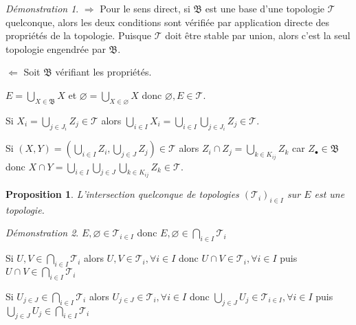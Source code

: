 \documentclass[a4paper, 11pt, french]{book}
\newenvironment{itemise}{\itemize}{\enditemize}
\theoremstyle{plain} %
\newtheorem{proposition}{Proposition}
\theoremstyle{definition} %
\theoremstyle{remark} %
\newtheorem*{demonstration}{Démonstration}
\newcommand{\1}{\mathds{1}}
\newcommand\vide{\varnothing}
\begin{document}
\begin{demonstration}
	\begin{itemise}
		\item[$\Rightarrow$] Pour le sens direct, si $\mathfrak{B}$ est une base d'une topologie $\mathscr{T}$ quelconque, alors les deux conditions sont vérifiée par application directe des propriétés de la topologie.
		Puisque $\mathscr{T}$ doit être stable par union, alors c'est la seul topologie engendrée par $\mathfrak{B}$.
		\item[$\Leftarrow$] Soit $\mathfrak{B}$ vérifiant les propriétés.
		\begin{itemise}
			\item $E=\bigcup_{X\in\mathfrak{B}}X$ et $\vide=\bigcup_{X\in\vide}X$ donc $\vide, E\in\mathscr{T}$.
			\item Si $X_i=\bigcup_{j\in J_i}Z_j\in\mathscr{T}$ alors $\bigcup_{i\in I}X_i=\bigcup_{i\in I}\bigcup_{j\in J_i}Z_j\in\mathscr{T}$.
			\item Si $(X, Y)=(\bigcup_{i\in I}Z_i, \bigcup_{j\in J}Z_j)\in\mathscr{T}$ alors $Z_i\cap Z_j=\bigcup_{k\in K_{ij}}Z_k$ car $Z_\bullet\in\mathfrak{B}$ donc $X\cap Y=\bigcup_{i\in I}\bigcup_{j\in J}\bigcup_{k\in K_{ij}}Z_k\in\mathscr{T}$.
		\end{itemise}
	\end{itemise}
\end{demonstration}

\begin{proposition}
	L'intersection quelconque de topologies $(\mathscr{T}_i)_{i\in I}$ sur $E$ est une topologie.
\end{proposition}

\begin{demonstration}
	\begin{itemise}
		\item $E, \vide\in\mathscr{T}_{i\in I}$ donc $E, \vide\in\bigcap_{i\in I}\mathscr{T}_i$
		\item Si $U, V\in\bigcap_{i\in I}\mathscr{T}_i$ alors $U, V\in\mathscr{T}_i, \forall i\in I$ donc $U\cap V\in\mathscr{T}_i, \forall i\in I$ puis $U\cap V\in\bigcap_{i\in I}\mathscr{T}_i$
		\item Si $U_{j\in J}\in\bigcap_{i\in I}\mathscr{T}_i$ alors $U_{j\in J}\in\mathscr{T}_i, \forall i\in I$ donc $\bigcup_{j\in J} U_j\in\mathscr{T}_{i\in I}, \forall i\in I$ puis $\bigcup_{j\in J} U_j\in\bigcap_{i\in I}\mathscr{T}_i$
	\end{itemise}
\end{demonstration}
\end{document}
